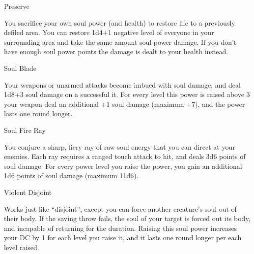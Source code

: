 \begin{soulpower}{Preserve}
  \rangeclose

  You sacrifice your own soul power (and health) to restore life to a
  previously defiled area. You can restore 1d4+1 negative level of everyone in
  your surrounding area and take the same amount soul power damage. If you
  don't have enough soul power points the damage is dealt to your health
  instead.
\end{soulpower}

\begin{soulpower}{Soul Blade}

  Your weapons or unarmed attacks become imbued with soul damage, and deal
  1d8+3 soul damage on a successful it. For every level this power is raised
  above 3 your weapon deal an additional +1 soul damage (maximum +7), and the
  power lasts one round longer.
\end{soulpower}

\begin{soulpower}{Soul Fire Ray}
  \rangeclose
  \instantaneous

  You conjure a sharp, fiery ray of raw soul energy that you can direct at
  your enemies. Each ray requires a ranged touch attack to hit, and deals 3d6
  points of soul damage. For every power level you raise the power, you gain
  an additional 1d6 points of soul damage (maximum 11d6).
\end{soulpower}

\begin{soulpower}{Violent Disjoint}
  \rangetouch

  Works just like ``disjoint'', except you can force another creature's soul
  out of their body. If the saving throw fails, the soul of your target is
  forced out its body, and incapable of returning for the duration. Raising
  this soul power increases your DC by 1 for each level you raise it, and it
  lasts one round longer per each level raised.
\end{soulpower}

